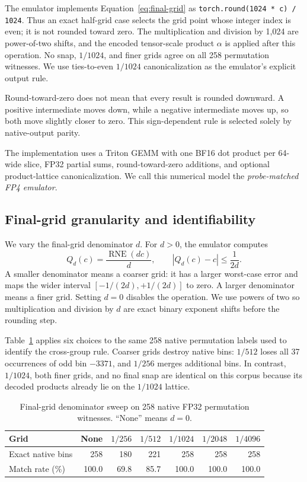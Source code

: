 \documentclass[11pt]{article}
\begin{document}
The emulator implements Equation~\ref{eq:final-grid} as
\texttt{torch.round(1024 * c) / 1024}.  Thus an exact half-grid case selects
the grid point whose integer index is even; it is not rounded toward zero.
The multiplication and division by 1,024 are power-of-two shifts, and the
encoded tensor-scale product $\alpha$ is applied after this operation.
No snap, $1/1024$, and finer grids agree on all 258 permutation witnesses.
We use ties-to-even $1/1024$ canonicalization as the emulator's explicit
output rule.

Round-toward-zero does not mean that every result is rounded downward.  A
positive intermediate moves down, while a negative intermediate moves up, so
both move slightly closer to zero.  This sign-dependent rule is selected solely
by native-output parity.

The implementation uses a Triton GEMM with one BF16 dot product per 64-wide
slice, FP32 partial sums, round-toward-zero additions, and optional
product-lattice canonicalization.  We call this numerical model the
\emph{probe-matched FP4 emulator}.

\subsection{Final-grid granularity and identifiability}

We vary the final-grid denominator $d$.  For $d>0$, the emulator computes
\begin{equation}
  Q_d(c)=\frac{\operatorname{RNE}(dc)}{d},
  \qquad
  |Q_d(c)-c|\leq \frac{1}{2d}.
  \label{eq:grid-denominator}
\end{equation}
A smaller denominator means a coarser grid: it has a larger worst-case error
and maps the wider interval $[-1/(2d),+1/(2d)]$ to zero.  A larger denominator
means a finer grid.  Setting $d=0$ disables the operation.  We use powers of two
so multiplication and division by $d$ are exact binary exponent shifts before
the rounding step.

Table~\ref{tab:grid-denominator-native} applies six choices to the same 258
native permutation labels used to identify the cross-group rule.  Coarser
grids destroy native bins: $1/512$ loses all 37 occurrences of odd bin $-3371$,
and $1/256$ merges additional bins.  In contrast, $1/1024$, both finer grids,
and no final snap are identical on this corpus because its decoded products
already lie on the $1/1024$ lattice.

\begin{table}[H]
  \centering
  \small
  \caption{Final-grid denominator sweep on 258 native FP32 permutation
  witnesses.  ``None'' means $d=0$.}
  \label{tab:grid-denominator-native}
  \begin{tabular}{@{}lrrrrrr@{}}
    \toprule
    Grid & None & $1/256$ & $1/512$ & $1/1024$ & $1/2048$ & $1/4096$ \\
    \midrule
    Exact native bins & 258 & 180 & 221 & 258 & 258 & 258 \\
    Match rate (\%) & 100.0 & 69.8 & 85.7 & 100.0 & 100.0 & 100.0 \\
    \bottomrule
  \end{tabular}
\end{table}
\end{document}
